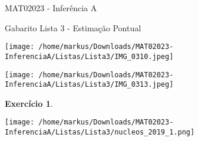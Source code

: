 \documentclass[letter,11pt]{article}
\newtheorem{exer}{Exercício}
\begin{document}
\begin{center}{ \Large MAT02023 - Inferência A }\end{center}

\begin{center}
{\large  \sc Gabarito Lista 3 - Estimação Pontual}
\end{center}
\vspace{15mm}

\texttt{[image: /home/markus/Downloads/MAT02023-InferenciaA/Listas/Lista3/IMG\_0310.jpeg]}

\texttt{[image: /home/markus/Downloads/MAT02023-InferenciaA/Listas/Lista3/IMG\_0313.jpeg]}

\pagebreak

\medskip
\setcounter{exer}{9}
\begin{exer} \rm
\end{exer}
\texttt{[image: /home/markus/Downloads/MAT02023-InferenciaA/Listas/Lista3/nucleos\_2019\_1.png]}
\end{document}
